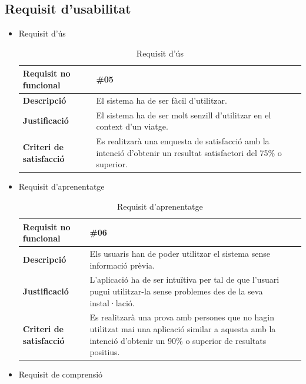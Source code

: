 \subsection{Requisit d'usabilitat}
\begin{itemize}

\item{Requisit d'ús}

\begin{table}[!h]
\begin{tabular}{|l|M|}
\hline
\textbf{Requisit no funcional }& \#05    \\ \hline
\textbf{Descripció} & El sistema ha de ser fàcil d’utilitzar.
 \\ \hline
\textbf{Justificació} &El sistema ha de ser molt senzill d’utilitzar en el context d’un viatge.\\ \hline
\textbf{Criteri de satisfacció} & Es realitzarà una enquesta de satisfacció amb la intenció d’obtenir un resultat satisfactori del 75\% o superior.
  \\ \hline
\end{tabular}
\label{}
\caption{Requisit d'ús}
\end{table}

\item{Requisit d'aprenentatge}

\begin{table}[!h]
\begin{tabular}{|l|M|}
\hline
\textbf{Requisit no funcional }& \#06   \\ \hline
\textbf{Descripció} &  Els usuaris han de poder utilitzar el sistema sense informació prèvia. \\ \hline
\textbf{Justificació} & L’aplicació ha de ser intuïtiva per tal de que l’usuari
pugui utilitzar-la sense problemes des de la seva instal·lació.   \\ \hline
\textbf{Criteri de satisfacció} & Es realitzarà una prova amb persones que no hagin utilitzat mai una aplicació similar a aquesta amb la
intenció d’obtenir un 90\% o superior de resultats positius.
  \\ \hline
\end{tabular}
\label{}
\caption{Requisit d'aprenentatge}
\end{table}

\clearpage

\item{Requisit de comprensió}


\end{itemize}
